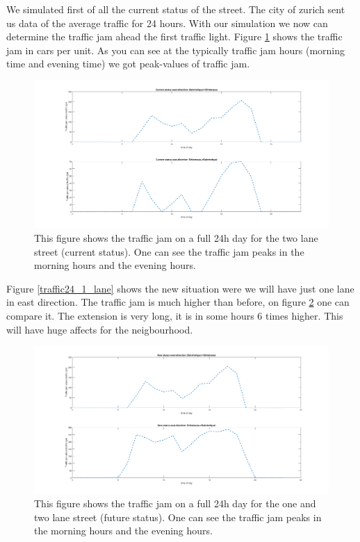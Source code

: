 \documentclass[11pt]{article}
\begin{document}
We simulated first of all the current status of the street. The city of zurich \cite{tief1} sent us data of the average traffic for 24 hours. With our simulation we now can determine the traffic jam ahead the first traffic light. Figure \ref{traffic24_2_lane} shows the traffic jam in cars per unit. As you can see at the typically traffic jam hours (morning time and evening time) we got peak-values of traffic jam.\\
\begin{figure}[h!]
	\centering
\includegraphics[width=\textwidth]{Current_Traffic_jam.png}
\caption{This figure shows the traffic jam on a full 24h day for the two lane street (current status). One can see the traffic jam peaks in the morning hours and the evening hours. }
\label{traffic24_2_lane}
\end{figure}
Figure \ref{traffic24_1_lane} shows the new situation were we will have just one lane in east direction. The traffic jam is much higher than before, on figure \ref{traffic24_compare} one can compare it. The extension is very long, it is in some hours 6 times higher. This will have huge affects for the neigbourhood.
\begin{figure}[h!]
	\centering
\includegraphics[width=\textwidth]{New_Traffic_jam.png}
\caption{This figure shows the traffic jam on a full 24h day for the one and two lane street (future status). One can see the traffic jam peaks in the morning hours and the evening hours. }
\label{traffic24_compare}
\end{figure}
\end{document}
